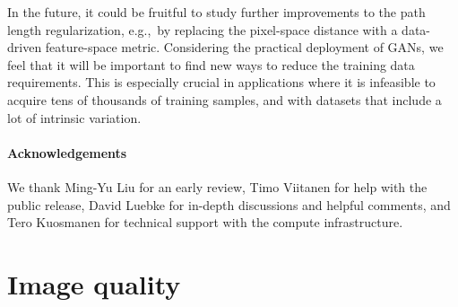 \documentclass[10pt,twocolumn,letterpaper]{article}
\newif\ifarxiv
\newcommand{\FINAL}[2][]{#2}
\begin{document}
In \FINAL{the} future, it could be fruitful to study further improvements to the path length regularization, e.g.,~by replacing the pixel-space  distance with a data-driven feature-space metric.
\FINAL{Considering the practical deployment of GANs, we feel that it will be important to find new ways to reduce the training data requirements. This is especially crucial in applications where it is infeasible to acquire tens of thousands of training samples, and with datasets that include a lot of intrinsic variation.}

\vspace{-2mm}
\paragraph*{\FINAL{Acknowledgements}}
\FINAL{
We thank Ming-Yu Liu for an early review, Timo Viitanen for help with the public release, David Luebke for in-depth discussions and helpful comments, and Tero Kuosmanen for technical support with the compute infrastructure. 
}

{\small


}

\ifarxiv
\clearpage
\appendix
\ifarxiv
	\newcommand{\refsecin}{Section~\ref{sec:in}}
	\newcommand{\reffigarch}{Figure~\ref{fig:arch}}
	\newcommand{\reffigGDarch}{Figure~\ref{fig:GDarch}}
	\newcommand{\refeqmodulation}{Equation~\ref{eq:modulation}}
	\newcommand{\refeqdemodulation}{Equation~\ref{eq:demodulation}}
	\newcommand{\refeqmodem}{Equations \ref{eq:modulation} and \ref{eq:demodulation}}
	\newcommand{\refseclazyreg}{Section~\ref{sec:lazyreg}}
	\newcommand{\refsecpathreg}{Section~\ref{sec:pathreg}}
	\newcommand{\refsecaltarch}{Section~\ref{sec:altarch}}
	\newcommand{\reftabmain}{Table~\ref{tab:main}}
	\newcommand{\reftabmains}{Tables \ref{tab:main} and \ref{tab:lsun}}
\else
	\newcommand{\refsecin}{Section~2 of the paper}
	\newcommand{\reffigarch}{Figure~1 of the paper}
	\newcommand{\reffigGDarch}{Figure~7 of the paper}
	\newcommand{\refeqmodulation}{Equation~1 of the paper}
	\newcommand{\refeqdemodulation}{Equation~3 of the paper}
	\newcommand{\refeqmodem}{Equations 1 and 3 of the paper}
	\newcommand{\refseclazyreg}{Section~3.1 of the paper}
	\newcommand{\refsecpathreg}{Section~3.2 of the paper}
	\newcommand{\refsecaltarch}{Section~4.1 of the paper}
	\newcommand{\reftabmain}{Table~1 of the paper}
	\newcommand{\reftabmains}{Tables~1 and~3 of the paper}
	\newcommand{\reftablsun}{Table~3 of the paper}
\fi

\section{Image quality} \label{app:imagequality}
\end{document}

